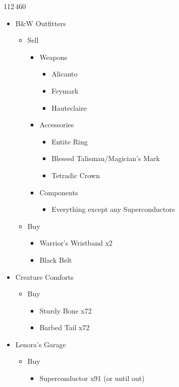 \begin{shop}{112\,460}
		\begin{itemize}
			\item B\&W Outfitters
			      \begin{itemize}
				      \item Sell
				            \begin{itemize}
					            \item Weapons
					                  \begin{itemize}
						                  \item Alicanto
						                  \item Feymark
						                  \item Hauteclaire
					                  \end{itemize}
					            \item Accessories
					                  \begin{itemize}
						                  \item Entite Ring
						                  \item Blessed Talisman/Magician's Mark
						                  \item Tetradic Crown
					                  \end{itemize}
					            \item Components
					                  \begin{itemize}
						                  \item Everything except any Superconductors
					                  \end{itemize}
				            \end{itemize}
				      \item Buy
				            \begin{itemize}
					            \item Warrior's Wristband x2
					            \item Black Belt
				            \end{itemize}
			      \end{itemize}
			\item Creature Comforts
			      \begin{itemize}
				      \item Buy
				            \begin{itemize}
					            \item Sturdy Bone x72
					            \item Barbed Tail x72
				            \end{itemize}
			      \end{itemize}
			\item Lenora's Garage
			      \begin{itemize}
				      \item Buy
				            \begin{itemize}
					            \item Superconductor x91 (or until out)
				            \end{itemize}
			      \end{itemize}
		\end{itemize}
\end{shop}
